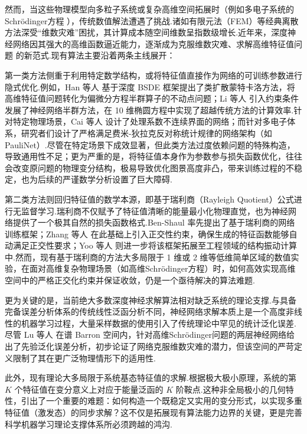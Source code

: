 然而，当这些物理模型向多粒子系统或复杂高维空间拓展时（例如多电子系统的Schr\"{o}dinger方程 \cite{berezin2012schrodinger,fortunato1998eigenvalue}），传统数值解法遭遇了挑战.诸如有限元法（FEM）等经典离散方法深受“维数灾难”困扰，其计算成本随空间维数呈指数级增长.近年来，深度神经网络因其强大的高维函数逼近能力，逐渐成为克服维数灾难、求解高维特征值问题 \cite{PhysRevResearc,hermann2020deep} 的新范式.现有算法主要沿着两条主线展开：

第一类方法侧重于利用特定数学结构，或将特征值直接作为网络的可训练参数进行隐式优化.例如，Han 等人 \cite{HAN2020109792} 基于深度 BSDE 框架提出了类扩散蒙特卡洛方法，将高维特征值问题转化为偏微分方程半群算子的不动点问题；Li 等人 \cite{li2022semigroup} 引入约束条件发展了神经网络半群方法，在 10 维椭圆方程中实现了超越传统方法的计算效率.针对特定物理场景，Cai 等人 \cite{cai2023deepmartnet} 设计了处理系数不连续界面的网络；而针对多电子体系，研究者们设计了严格满足费米-狄拉克反对称统计规律的网络架构（如 PauliNet）.尽管在特定场景下成效显著，但此类方法过度依赖问题的特殊构造，导致通用性不足；更为严重的是，将特征值本身作为参数参与损失函数优化，往往会改变原问题的物理变分结构，极易导致优化图景高度非凸，带来训练过程的不稳定，也为后续的严谨数学分析设置了巨大障碍.

第二类方法则回归特征值的数学本源，即基于瑞利商（Rayleigh Quotient）公式进行无监督学习.瑞利商不仅赋予了特征值清晰的能量最小化物理直觉，也为神经网络提供了一个极其自然的损失函数格式.Ben-Shaul \cite{ben2023deep} 率先提出了基于瑞利商的网络训练框架；Zhang 等人 \cite{zhang2024deep} 在此基础上引入正交性约束，确保生成的特征函数能够自动满足正交性要求；Yoo 等人 \cite{yoo2025physics} 则进一步将该框架拓展至工程领域的结构振动计算中.然而，现有基于瑞利商的方法大多局限于 1 维或 2 维等低维简单区域的数值实验，在面对高维复杂物理场景（如高维Schr\"{o}dinger方程）时，如何高效实现高维空间中的严格正交化约束并保证收敛，仍是一个亟待解决的算法难题.

更为关键的是，当前绝大多数深度神经求解算法相对缺乏系统的理论支撑.与具备完备误差分析体系的传统线性泛函分析不同，神经网络求解本质上是一个高度非线性的机器学习过程，大量采样数据的使用引入了传统理论中罕见的统计泛化误差.尽管 Lu 等人 \cite{lu2021priorieigen} 在谱 Barron 空间内，针对高维Schr\"{o}dinger问题的两层神经网络给出了先验泛化误差分析，初步论证了网络克服维数灾难的潜力，但该空间的严苛定义限制了其在更广泛物理情形下的适用性.

此外，现有理论大多局限于系统基态特征值的求解.根据极大极小原理，系统的第 $K$ 个特征值在变分意义上对应于能量泛函的 $K$ 阶鞍点.这种非全局极小的几何特性，引出了一个重要的难题：如何构造一个既稳定又实用的变分形式，以实现多重特征值（激发态）的同步求解？这不仅是拓展现有算法能力边界的关键，更是完善科学机器学习理论支撑体系所必须跨越的鸿沟.



